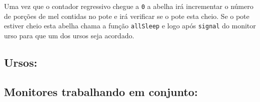 \documentclass[12pt,a4paper]{article}
\begin{document}
Uma vez que o contador regressivo chegue a \verb+0+ a abelha irá incrementar o número de porções de mel contidas no pote e irá verificar se o pote esta cheio. Se o pote estiver cheio esta abelha chama a função \verb+allSleep+ e logo após \verb+signal+ do monitor urso para que um dos ursos seja acordado.

\subsection{Ursos:}

\subsection{Monitores trabalhando em conjunto:}
\end{document}
